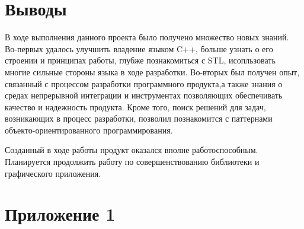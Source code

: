 \section{Выводы}

В ходе выполнения данного проекта было получено множество новых знаний. Во-первых удалось улучшить владение языком C++, больше узнать о его строении и принципах работы, глубже познакомиться с STL, исопльзовать многие сильные стороны языка в ходе разработки. Во-вторых был получен опыт, связанный с процессом разработки программного продукта,а также знания о средах непрерывной интеграции и инструментах позволяющих обеспечивать качество и надежность продукта. Кроме того, поиск решений для задач, возникающих в процесс разработки, позволил познакомится с паттернами объекто-ориентированного программирования.

Созданный в ходе работы продукт оказался вполне работоспособным. Планируется продолжить работу по совершенствованию библиотеки и графического приложения. 
\section{Приложение 1}
\label{sec:listings}

\label{listing:GameAPI} 

\parindent=0.6cm

\label{listing:AI} 

\parindent=0.6cm

\label{listing:AbstractBoard} 

\parindent=0.6cm

\label{listing:AbstractGameLogic} 

\parindent=0.6cm

\label{listing:GameSaver} 

\parindent=0.6cm


\label{listing:GameLoader} 

\parindent=0.6cm

\label{listing:SaveReader} 

\parindent=0.6cm

